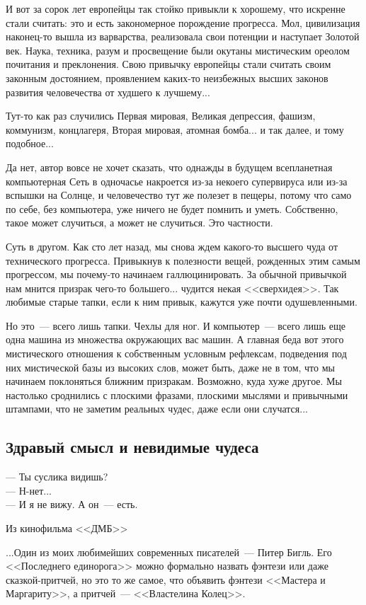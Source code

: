 \documentclass{scrbook}
\makeatletter
\newcommand{\defaultepigraphwidth}{0.5} %
\newcommand{\flqq}{<<}
\newcommand{\frqq}{>>}
\newcommand{\mdash}{~--- }
\newcommand{\sdash}{--- } %
\newcommand{\essaysection}[1]{\subsection*{#1}\nopagebreak}
\newcommand{\myepigraph}[3][\@empty]{
	\ifx\@empty#1
		\setlength{\epigraphwidth}{\defaultepigraphwidth\textwidth}
	\else
		\setlength{\epigraphwidth}{#1\textwidth}
	\fi
	\epigraph{#2}{#3}
	\setlength{\epigraphwidth}{\defaultepigraphwidth\textwidth} %
	\nopagebreak
}
\makeatother
\begin{document}
И вот за сорок лет европейцы так стойко привыкли к хорошему, что искренне стали считать: это и есть закономерное порождение прогресса. Мол, цивилизация наконец-то вышла из варварства, реализовала свои потенции и наступает Золотой век. Наука, техника, разум и просвещение были окутаны мистическим ореолом почитания и преклонения. Свою привычку европейцы стали считать своим законным достоянием, проявлением каких-то неизбежных высших законов развития человечества от худшего к лучшему...

Тут-то как раз случились Первая мировая, Великая депрессия, фашизм, коммунизм, концлагеря, Вторая мировая, атомная бомба... и так далее, и тому подобное...

Да нет, автор вовсе не хочет сказать, что однажды в будущем всепланетная компьютерная Сеть в одночасье накроется из-за некоего супервируса или из-за вспышки на Солнце, и человечество тут же полезет в пещеры, потому что само по себе, без компьютера, уже ничего не будет помнить и уметь. Собственно, такое может случиться, а может не случиться. Это частности.

Суть в другом. Как сто лет назад, мы снова ждем какого-то высшего чуда от технического прогресса. Привыкнув к полезности вещей, рожденных этим самым прогрессом, мы почему-то начинаем галлюцинировать. За обычной привычкой нам мнится призрак чего-то большего... чудится некая {\flqq}сверхидея{\frqq}. Так любимые старые тапки, если к ним привык, кажутся уже почти одушевленными.

Но это{\mdash}всего лишь тапки. Чехлы для ног. И компьютер{\mdash}всего лишь еще одна машина из множества окружающих вас машин. А главная беда вот этого мистического отношения к собственным условным рефлексам, подведения под них мистической базы из высоких слов, может быть, даже не в том, что мы начинаем поклоняться ближним призракам. Возможно, куда хуже другое. Мы настолько сроднились с плоскими фразами, плоскими мыслями и привычными штампами, что не заметим реальных чудес, даже если они случатся...

\essaysection{Здравый смысл и невидимые чудеса}

\myepigraph{{\sdash} Ты суслика видишь? \\
{\sdash} Н-нет... \\
{\sdash} И я не вижу. А он{\mdash}есть.}
{Из кинофильма {\flqq}ДМБ{\frqq}}

...Один из моих любимейших современных писателей{\mdash}Питер Бигль. Его {\flqq}Последнего единорога{\frqq} можно формально назвать фэнтези или даже сказкой-притчей, но это то же самое, что объявить фэнтези {\flqq}Мастера и Маргариту{\frqq}, а притчей{\mdash}{\flqq}Властелина Колец{\frqq}.
\end{document}
